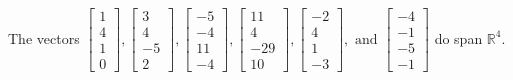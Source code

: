 \begin{exercise}
\begin{exerciseStatement}
  \end{exerciseStatement}
  \begin{exerciseAnswer}
   The vectors \(\left[\begin{array}{r}
1 \\
4 \\
1 \\
0
\end{array}\right] , \left[\begin{array}{r}
3 \\
4 \\
-5 \\
2
\end{array}\right] , \left[\begin{array}{r}
-5 \\
-4 \\
11 \\
-4
\end{array}\right] , \left[\begin{array}{r}
11 \\
4 \\
-29 \\
10
\end{array}\right] , \left[\begin{array}{r}
-2 \\
4 \\
1 \\
-3
\end{array}\right] , \text{ and } \left[\begin{array}{r}
-4 \\
-1 \\
-5 \\
-1
\end{array}\right]\) 
  	 do  
	span \(\mathbb{R}^4\).
  


  \end{exerciseAnswer}
\end{exercise}